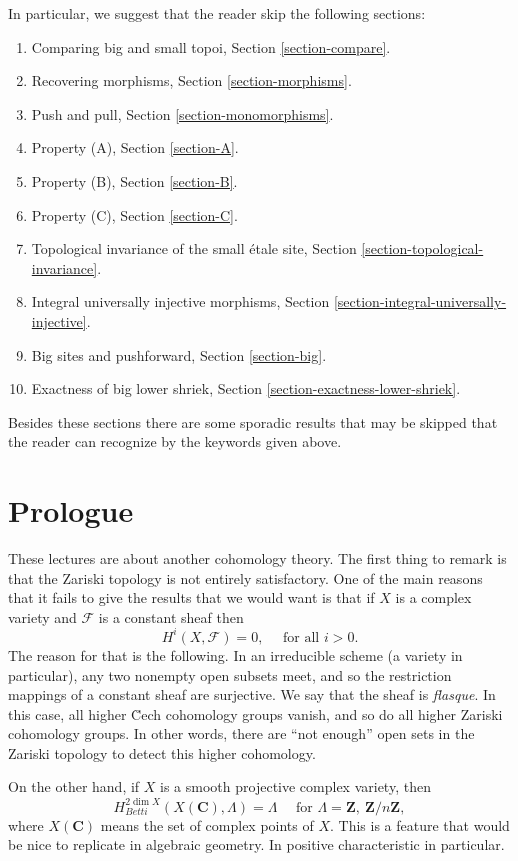 \medskip\noindent
In particular, we suggest that the reader skip the following sections:
\begin{enumerate}
\item Comparing big and small topoi,
Section \ref{section-compare}.
\item Recovering morphisms,
Section \ref{section-morphisms}.
\item Push and pull,
Section \ref{section-monomorphisms}.
\item Property (A),
Section \ref{section-A}.
\item Property (B),
Section \ref{section-B}.
\item Property (C),
Section \ref{section-C}.
\item Topological invariance of the small \'etale site,
Section \ref{section-topological-invariance}.
\item Integral universally injective morphisms,
Section \ref{section-integral-universally-injective}.
\item Big sites and pushforward,
Section \ref{section-big}.
\item Exactness of big lower shriek,
Section \ref{section-exactness-lower-shriek}.
\end{enumerate}
Besides these sections there are some sporadic results that may be skipped
that the reader can recognize by the keywords given above.



\section{Prologue}
\label{section-prologue}

\noindent
These lectures are about another cohomology theory. The first thing to remark
is that the Zariski topology is not entirely satisfactory. One of the main
reasons that it fails to give the results that we would want is that if $X$ is
a complex variety and $\mathcal{F}$ is a constant sheaf then
$$
H^i(X, \mathcal{F}) = 0, \quad \text{ for all } i > 0.
$$
The reason for that is the following. In an irreducible scheme (a variety in
particular), any two nonempty open subsets meet, and so the restriction
mappings of a constant sheaf are surjective. We say that the sheaf is
{\it flasque}. In this case, all higher \u Cech cohomology groups vanish, and
so do all higher Zariski cohomology groups. In other words, there are ``not
enough'' open sets in the Zariski topology to detect this higher cohomology.

\medskip\noindent
On the other hand, if $X$ is a smooth projective complex variety, then
$$
H_{Betti}^{2 \dim X}(X (\mathbf{C}), \Lambda) = \Lambda \quad \text{ for }
\Lambda = \mathbf{Z}, \ \mathbf{Z}/n\mathbf{Z},
$$
where $X(\mathbf{C})$ means the set of complex points of $X$. This is a feature
that would be nice to replicate in algebraic geometry. In positive
characteristic in particular.




